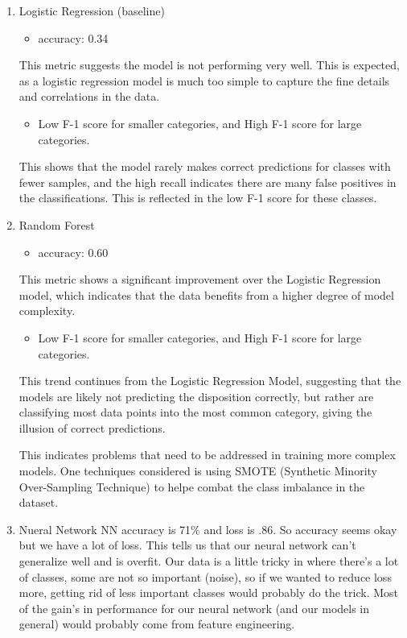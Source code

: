 \documentclass[final]{article}
\begin{document}
\begin{enumerate}
  \item Logistic Regression (baseline)
  \begin{itemize}
    \item accuracy: 0.34
  \end{itemize}
  This metric suggests the model is not performing very well. This is expected, as a logistic regression model is much too simple to capture the fine details and correlations in the data.
  \begin{itemize}
    \item Low F-1 score for smaller categories, and High F-1 score for large categories.
  \end{itemize}
  This shows that the model rarely makes correct predictions for classes with fewer samples, and the high recall indicates there are many false positives in the classifications. This is reflected in the low F-1 score for these classes.
  \item Random Forest
  \begin{itemize}
    \item accuracy: 0.60
  \end{itemize}
  This metric shows a significant improvement over the Logistic Regression model, which indicates that the data benefits from a higher degree of model complexity.
  \begin{itemize}
    \item Low F-1 score for smaller categories, and High F-1 score for large categories.
  \end{itemize}
  This trend continues from the Logistic Regression Model, suggesting that the models are likely not predicting the disposition correctly, but rather are classifying most data points into the most common category, giving the illusion of correct predictions.

  This indicates problems that need to be addressed in training more complex models. One techniques considered is using SMOTE (Synthetic Minority Over-Sampling Technique) to helpe combat the class imbalance in the dataset.
  \item Nueral Network
  NN accuracy is 71\% and loss is .86. So accuracy seems okay but we have a lot of loss. This tells us that our neural network can’t  generalize well and is overfit. 
  Our data is a little tricky in where there’s a lot of classes, some are not so important (noise), so if we wanted to reduce loss more, getting rid of less important classes would probably do the trick.
  Most of the gain’s in performance for our neural network (and our models in general) would probably come from feature engineering. 
\end{enumerate}
\end{document}
